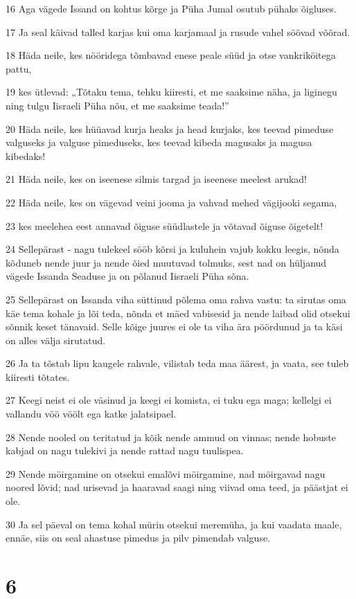 \par 16 Aga vägede Issand on kohtus kõrge ja Püha Jumal osutub pühaks õigluses.
\par 17 Ja seal käivad talled karjas kui oma karjamaal ja rusude vahel söövad võõrad.
\par 18 Häda neile, kes nööridega tõmbavad enese peale süüd ja otse vankriköitega pattu,
\par 19 kes ütlevad: „Tõtaku tema, tehku kiiresti, et me saaksime näha, ja liginegu ning tulgu Iisraeli Püha nõu, et me saaksime teada!”
\par 20 Häda neile, kes hüüavad kurja heaks ja head kurjaks, kes teevad pimeduse valguseks ja valguse pimeduseks, kes teevad kibeda magusaks ja magusa kibedaks!
\par 21 Häda neile, kes on iseenese silmis targad ja iseenese meelest arukad!
\par 22 Häda neile, kes on vägevad veini jooma ja vahvad mehed vägijooki segama,
\par 23 kes meelehea eest annavad õiguse süüdlastele ja võtavad õiguse õigetelt!
\par 24 Sellepärast - nagu tulekeel sööb kõrsi ja kuluhein vajub kokku leegis, nõnda kõduneb nende juur ja nende õied muutuvad tolmuks, sest nad on hüljanud vägede Issanda Seaduse ja on põlanud Iisraeli Püha sõna.
\par 25 Sellepärast on Issanda viha süttinud põlema oma rahva vastu: ta sirutas oma käe tema kohale ja lõi teda, nõnda et mäed vabisesid ja nende laibad olid otsekui sõnnik keset tänavaid. Selle kõige juures ei ole ta viha ära pöördunud ja ta käsi on alles välja sirutatud.
\par 26 Ja ta tõstab lipu kaugele rahvale, vilistab teda maa äärest, ja vaata, see tuleb kiiresti tõtates.
\par 27 Keegi neist ei ole väsinud ja keegi ei komista, ei tuku ega maga; kellelgi ei vallandu vöö vöölt ega katke jalatsipael.
\par 28 Nende nooled on teritatud ja kõik nende ammud on vinnas; nende hobuste kabjad on nagu tulekivi ja nende rattad nagu tuulispea.
\par 29 Nende möirgamine on otsekui emalõvi möirgamine, nad möirgavad nagu noored lõvid; nad urisevad ja haaravad saagi ning viivad oma teed, ja päästjat ei ole.
\par 30 Ja sel päeval on tema kohal mürin otsekui meremüha, ja kui vaadata maale, ennäe, siis on seal ahastuse pimedus ja pilv pimendab valguse.

\chapter{6}

